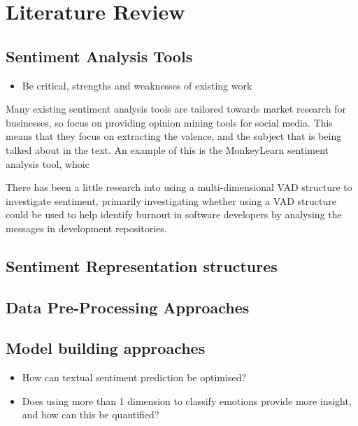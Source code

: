 
\section{Literature Review}
\subsection{Sentiment Analysis Tools}
\begin{itemize}
    \item Be critical, strengths and weaknesses of existing work
\end{itemize}

Many existing sentiment analysis tools are tailored towards market research for businesses, so focus on providing opinion mining tools for social media. This means that they focus on extracting the valence, and the subject that is being talked about in the text. An example of this is the MonkeyLearn sentiment analysis tool, whoic

There has been a little research into using a multi-dimensional VAD structure to investigate sentiment, primarily investigating whether using a VAD structure could be used to help identify burnout in software developers by analysing the messages in development repositories. \cite{mantyla2016mining}

\subsection{Sentiment Representation structures}





\subsection{Data Pre-Processing Approaches}
\subsection{Model building approaches}
\begin{itemize}
    \item How can textual sentiment prediction be optimised?
    \item Does using more than 1 dimension to classify emotions provide more insight, and how can this be quantified?
\end{itemize}